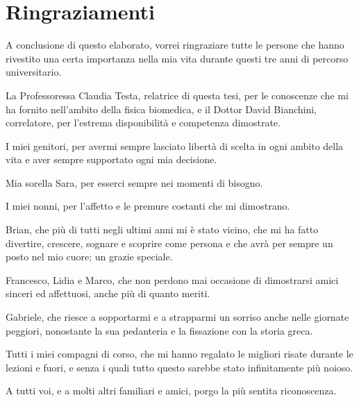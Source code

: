 \chapter*{Ringraziamenti}
A conclusione di questo elaborato, vorrei ringraziare tutte le persone che hanno rivestito una certa importanza nella mia vita durante questi tre anni di percorso universitario.

La Professoressa Claudia Testa, relatrice di questa tesi, per le conoscenze che mi ha fornito nell'ambito della fisica biomedica, e il Dottor David Bianchini, correlatore, per l'estrema disponibilità e competenza dimostrate.

I miei genitori, per avermi sempre lasciato libertà di scelta in ogni ambito della vita e aver sempre supportato ogni mia decisione.

Mia sorella Sara, per esserci sempre nei momenti di bisogno.

I miei nonni, per l'affetto e le premure costanti che mi dimostrano.

Brian, che più di tutti negli ultimi anni mi è stato vicino, che mi ha fatto divertire, crescere, sognare e scoprire come persona e che avrà per sempre un posto nel mio cuore; un grazie speciale.

Francesco, Lidia e Marco, che non perdono mai occasione di dimostrarsi amici sinceri ed affettuosi, anche più di quanto meriti.

Gabriele, che riesce a sopportarmi e a strapparmi un sorriso anche nelle giornate peggiori, nonostante la sua pedanteria e la fissazione con la storia greca.

Tutti i miei compagni di corso, che mi hanno regalato le migliori risate durante le lezioni e fuori, e senza i quali tutto questo sarebbe stato infinitamente più noioso.

A tutti voi, e a molti altri familiari e amici, porgo la più sentita riconoscenza.